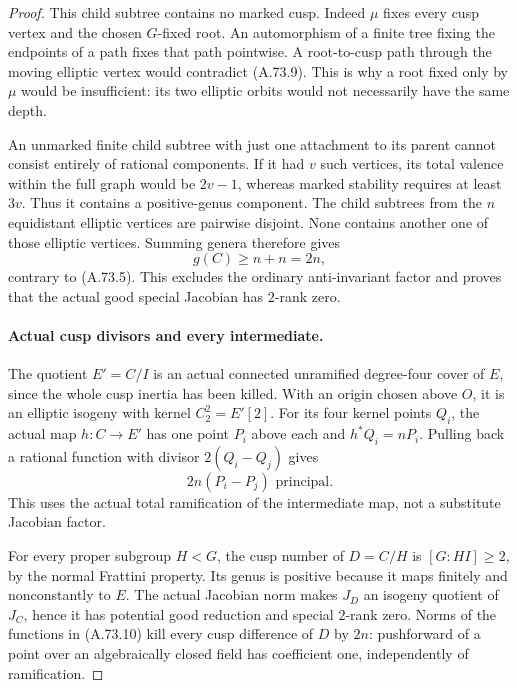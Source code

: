 \begin{proof}
This child subtree contains no marked cusp. Indeed \(\mu\)
fixes every cusp vertex and the chosen \(G\)-fixed root.
An automorphism of a finite tree fixing the endpoints of a
path fixes that path pointwise. A root-to-cusp path through
the moving elliptic vertex would contradict (A.73.9).
This is why a root fixed only by \(\mu\) would be
insufficient: its two elliptic orbits would not necessarily
have the same depth.

An unmarked finite child subtree with just one attachment
to its parent cannot consist entirely of rational components.
If it had \(v\) such vertices, its total valence within
the full graph would be \(2v-1\), whereas marked stability
requires at least \(3v\). Thus it contains a positive-genus
component. The child subtrees from the \(n\) equidistant
elliptic vertices are pairwise disjoint. None contains another
one of those elliptic vertices. Summing genera therefore gives
\[
                  g(C)\ge n+n=2n,
\]
contrary to (A.73.5). This excludes the ordinary anti-invariant
factor and proves that the actual good special Jacobian has
\(2\)-rank zero.

\paragraph{Actual cusp divisors and every intermediate.}
The quotient \(E'=C/I\) is an actual connected unramified
degree-four cover of \(E\), since the whole cusp inertia
has been killed. With an origin chosen above \(O\), it is
an elliptic isogeny with kernel \(C_2^2=E'[2]\).
For its four kernel points \(Q_i\), the actual map
\(h:C\to E'\) has one point \(P_i\) above each and
\(h^*Q_i=nP_i\). Pulling back a rational function with
divisor \(2(Q_i-Q_j)\) gives
\[
                    2n(P_i-P_j)\text{ principal}.
                                                        \tag{A.73.10}
\]
This uses the actual total ramification of the intermediate
map, not a substitute Jacobian factor.

For every proper subgroup \(H<G\), the cusp number of
\(D=C/H\) is \([G:HI]\ge2\), by the normal Frattini
property. Its genus is positive because it maps finitely
and nonconstantly to \(E\). The actual Jacobian norm
makes \(J_D\) an isogeny quotient of \(J_C\), hence it
has potential good reduction and special \(2\)-rank zero.
Norms of the functions in (A.73.10) kill every cusp
difference of \(D\) by \(2n\): pushforward of a point
over an algebraically closed field has coefficient one,
independently of ramification.


\end{proof}
